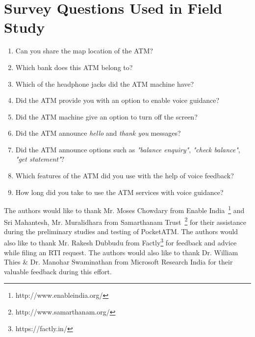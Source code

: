 \section{Survey Questions Used in Field Study}
\label{appendix:fieldsurveyquestions}

\begin{enumerate}
    \item Can you share the map location of the ATM?
    \item Which bank does this ATM belong to?
    \item Which of the headphone jacks did the ATM machine have?
    \item Did the ATM provide you with an option to enable voice guidance?
    \item Did the ATM machine give an option to turn off the screen?
    \item Did the ATM announce \textit{hello} and \textit{thank you} messages?
    \item Did the ATM announce options such as \textit{"balance enquiry"}, \textit{"check balance"}, \textit{"get statement"}?
    \item Which features of the ATM did you use with the help of voice feedback?
    \item How long did you take to use the ATM services with voice guidance?
\end{enumerate}

\begin{acks}
The authors would like to thank Mr. Moses Chowdary from Enable India~\footnote{http://www.enableindia.org/} and Sri Mahantesh, Mr. Muralidhara from Samarthanam Trust~\footnote{http://www.samarthanam.org/} for their assistance during the preliminary studies and testing of PocketATM. The authors would also like to thank Mr. Rakesh Dubbudu from Factly\footnote{https://factly.in/} for feedback and advice while filing an RTI request. The authors would also like to thank Dr. William Thies \& Dr. Manohar Swaminathan from Microsoft Research India for their valuable feedback during this effort.
\end{acks}
